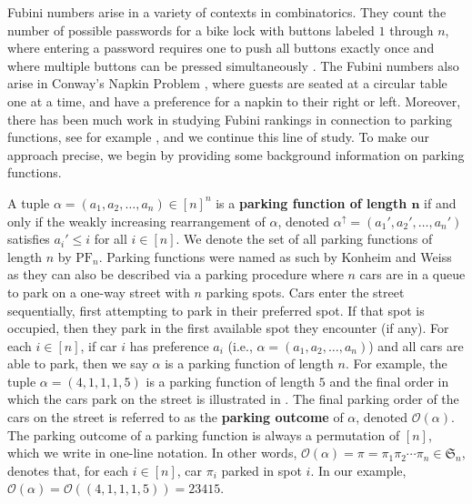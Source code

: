 \documentclass{amsart}
\newcommand{\defterm}{\textbf}
\theoremstyle{definition}
\theoremstyle{definition}
\theoremstyle{remark}
\newcommand{\PF}[1]{\mathrm{PF}_{#1}}
\newcommand{\out}{\mathcal{O}}
\newcommand{\Sym}{\mathfrak{S}}
\begin{document}
Fubini numbers arise in a variety of contexts in combinatorics. 
They count the number of possible passwords for a bike lock with buttons labeled $1$ through $n$, where entering a password requires one to push all buttons exactly once and where multiple buttons can be pressed simultaneously \cite{Permutations_and_combination_locks}. 
The Fubini numbers also arise in Conway's Napkin Problem \cite{napkin}, where guests are seated at a circular table one at a time, and have a preference for a napkin to their right or left. 
Moreover, there has been much work in studying Fubini rankings in connection to parking functions, see for example  \cite{weak,rFubini}, and we continue this line of study.
To make our approach precise, we begin by providing some background information on parking functions. 

A tuple $\alpha=(a_1,a_2,\ldots,a_n)\in[n]^n$ is a \defterm{parking function of length $\boldsymbol{n}$} if and only if the weakly increasing rearrangement of $\alpha$, denoted $\alpha^{\uparrow}=(a_1',a_2',\ldots,a_n')$ 
satisfies $a_i'\leq i$ for all $i\in[n]$. We denote the set of all parking functions of length $n$ by $\PF{n}$. 
Parking functions were named as such by Konheim and Weiss \cite{Konheim1966AnOD} as they can also be described via a parking procedure where $n$ cars are in a queue to park on a one-way street with $n$ parking spots. 
Cars enter the street sequentially, first attempting to park in their preferred spot. 
If that spot is occupied, then they park in the first available spot they encounter (if any). 
For each $i\in[n]$, if car $i$ has preference $a_i$  (i.e., 
$\alpha=(a_1,a_2,\ldots,a_n)$) and all cars are able to park, then we say $\alpha$ is a parking function of length $n$.
For example, the tuple $\alpha=(4,1,1,1,5)$ is a parking function of length $5$ and the final order in which the cars park on the street is illustrated in . 
The final parking order of the cars on the street is referred to as the \defterm{parking outcome} of $\alpha$, denoted $\out(\alpha)$. 
The parking outcome of a parking function is always a permutation of $[n]$, which we write in one-line notation.
In other words, $\out(\alpha)=\pi=\pi_1\pi_2\cdots\pi_n\in\Sym_n$, denotes that, for each $i\in[n]$, car $\pi_i$ parked in spot $i$. 
In our example, $\out(\alpha)=\out((4,1,1,1,5))=23415$.
\end{document}
